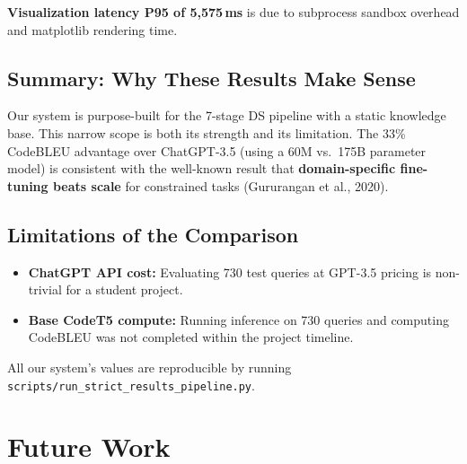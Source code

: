 \documentclass[12pt,a4paper]{article}
\begin{document}
\textbf{Visualization latency P95 of 5,575\,ms} is due to subprocess sandbox overhead and matplotlib rendering time.

\subsection{Summary: Why These Results Make Sense}

Our system is purpose-built for the 7-stage DS pipeline with a static knowledge base. This narrow scope is both its strength and its limitation. The 33\% CodeBLEU advantage over ChatGPT-3.5 (using a 60M vs.\ 175B parameter model) is consistent with the well-known result that \textbf{domain-specific fine-tuning beats scale} for constrained tasks (Gururangan et al., 2020).

\subsection{Limitations of the Comparison}

\begin{itemize}[leftmargin=*]
  \item \textbf{ChatGPT API cost:} Evaluating 730 test queries at GPT-3.5 pricing is non-trivial for a student project.
  \item \textbf{Base CodeT5 compute:} Running inference on 730 queries and computing CodeBLEU was not completed within the project timeline.
\end{itemize}

All our system's values are reproducible by running \texttt{scripts/run\_strict\_results\_pipeline.py}.

\section{Future Work}
\end{document}

